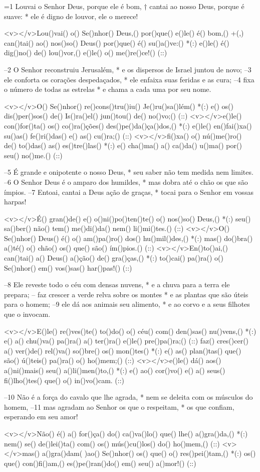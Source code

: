 =1 Louvai o Senhor Deus, porque ele é bom, †
cantai ao nosso Deus, porque é suave: *
ele é digno de louvor, ele o merece!

<v></v>Lou()vai() o() Se()nhor() Deus,() por()que() e()le() é() bom,() +(,)
can()tai() ao() nos()so() Deus() por()que() é() su()a()ve:() *(:)
e()le() é() dig()no() de() lou()vor,() e()le() o() me()re()ce!() (::)

–2 O Senhor reconstruiu Jerusalém, *
e os dispersos de Israel juntou de novo;
–3 ele conforta os corações despedaçados, *
ele enfaixa suas feridas e as cura;
–4 fixa o número de todas as estrelas *
e chama a cada uma por seu nome.

<v></v>O() Se()nhor() re()cons()tru()iu() Je()ru()sa()lém() *(:)
e() os() dis()per()sos() de() Is()ra()el() jun()tou() de() no()vo;() (::)
<v></v>e()le() con()for()ta() os() co()ra()ções() des()pe()da()ça()dos,() *(:)
e()le() en()fai()xa() su()as() fe()ri()das() e() as() cu()ra;() (::)
<v></v>fi()xa() o() nú()me()ro() de() to()das() as() es()tre()las() *(:)
e() cha()ma() a() ca()da() u()ma() por() seu() no()me.() (::)

–5 É grande e onipotente o nosso Deus, *
seu saber não tem medida nem limites.
–6 O Senhor Deus é o amparo dos humildes, *
mas dobra até o chão os que são ímpios.
–7 Entoai, cantai a Deus ação de graças, *
tocai para o Senhor em vossas harpas!

<v></v>É() gran()de() e() o()ni()po()ten()te() o() nos()so() Deus,() *(:)
seu() sa()ber() não() tem() me()di()da() nem() li()mi()tes.() (::)
<v></v>O() Se()nhor() Deus() é() o() am()pa()ro() dos() hu()mil()des,() *(:)
mas() do()bra() a()té() o() chão() os() que() são() ím()pios.() (::)
<v></v>En()to()ai,() can()tai() a() Deus() a()ção() de() gra()ças,() *(:)
to()cai() pa()ra() o() Se()nhor() em() vos()sas() har()pas!() (::)

–8 Ele reveste todo o céu com densas nuvens, *
e a chuva para a terra ele prepara;
– faz crescer a verde relva sobre os montes *
e as plantas que são úteis para o homem;
–9 ele dá aos animais seu alimento, *
e ao corvo e a seus filhotes que o invocam.

<v></v>E()le() re()ves()te() to()do() o() céu() com() den()sas() nu()vens,() *(:)
e() a() chu()va() pa()ra() a() ter()ra() e()le() pre()pa()ra;() (::)
faz() cres()cer() a() ver()de() rel()va() so()bre() os() mon()tes() *(:)
e() as() plan()tas() que() são() ú()teis() pa()ra() o() ho()mem;() (::)
<v></v>e()le() dá() aos() a()ni()mais() seu() a()li()men()to,() *(:)
e() ao() cor()vo() e() a() seus() fi()lho()tes() que() o() in()vo()cam. (::)

–10 Não é a força do cavalo que lhe agrada, *
nem se deleita com os músculos do homem,
–11 mas agradam ao Senhor os que o respeitam, *
os que confiam, esperando em seu amor!

<v></v>Não() é() a() for()ça() do() ca()va()lo() que() lhe() a()gra()da,() *(:)
nem() se() de()lei()ta() com() os() mús()cu()los() do() ho()mem,() (::)
<v></v>mas() a()gra()dam( )ao() Se()nhor() os() que() o() res()pei()tam,() *(:)
os() que() con()fi()am,() es()pe()ran()do() em() seu() a()mor!() (::)
